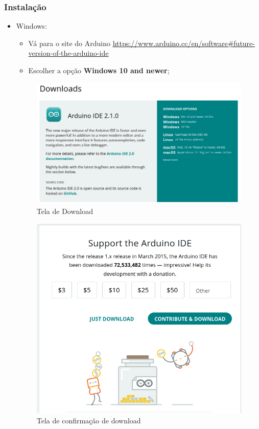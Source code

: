 \documentclass[12pt]{beamer}
\begin{document}
\begin{frame}[allowframebreaks]
    \frametitle{Instalação}

    \begin{itemize}
        \item Windows:
            \begin{itemize}
                \item Vá para o site do Arduino \url{https://www.arduino.cc/en/software\#future-version-of-the-arduino-ide}
                \item Escolher a opção \textbf{Windows 10 and newer};
            \end{itemize}

        \framebreak%
        \begin{figure}
            \centering
            \includegraphics[height=.68\textheight]{download_arduino_ide}
            \caption{Tela de Download}
        \end{figure}

        \framebreak%
        \begin{figure}
            \centering
            \includegraphics[height=.68\textheight]{download}
            \caption{Tela de confirmação de download}
        \end{figure}



\end{itemize}
\end{frame}
\end{document}
